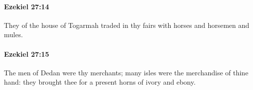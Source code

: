 		\paragraph{Ezekiel 27:14} %
			\label{EZEKIEL-27-14}

			They of the house of Togarmah traded in thy fairs with horses and horsemen and mules.


		\paragraph{Ezekiel 27:15} %
			\label{EZEKIEL-27-15}

			The men of Dedan were thy merchants; many isles were the merchandise of thine hand: they brought thee for a present horns of ivory and ebony.


